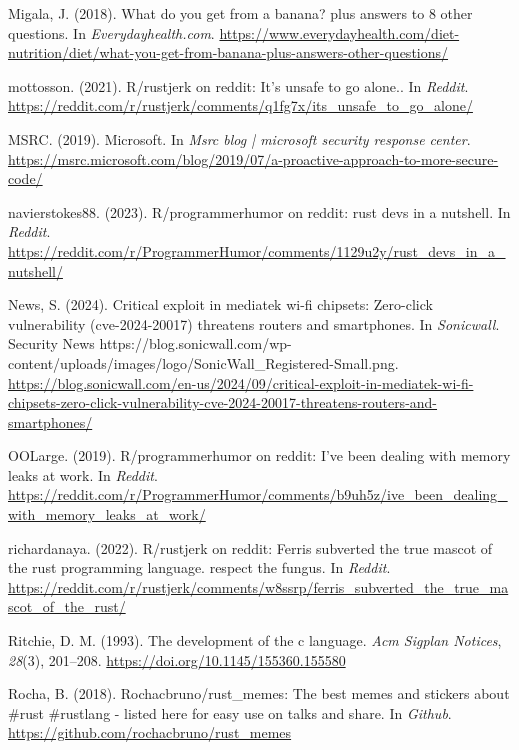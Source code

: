 \documentclass[11pt]{article}
\begin{document}
\begin{hangparas}{1.5em}{1}
\hypertarget{citeproc_bib_item_22}{Migala, J. (2018). What do you get from a banana? plus answers to 8 other questions. In \textit{Everydayhealth.com}. \url{https://www.everydayhealth.com/diet-nutrition/diet/what-you-get-from-banana-plus-answers-other-questions/}}

\hypertarget{citeproc_bib_item_23}{mottosson. (2021). R/rustjerk on reddit: It’s unsafe to go alone.. In \textit{Reddit}. \url{https://reddit.com/r/rustjerk/comments/q1fg7x/its_unsafe_to_go_alone/}}

\hypertarget{citeproc_bib_item_24}{MSRC. (2019). Microsoft. In \textit{Msrc blog | microsoft security response center}. \url{https://msrc.microsoft.com/blog/2019/07/a-proactive-approach-to-more-secure-code/}}

\hypertarget{citeproc_bib_item_25}{navierstokes88. (2023). R/programmerhumor on reddit: rust devs in a nutshell. In \textit{Reddit}. \url{https://reddit.com/r/ProgrammerHumor/comments/1129u2y/rust_devs_in_a_nutshell/}}

\hypertarget{citeproc_bib_item_26}{News, S. (2024). Critical exploit in mediatek wi-fi chipsets: Zero-click vulnerability (cve-2024-20017) threatens routers and smartphones. In \textit{Sonicwall}. Security News https://blog.sonicwall.com/wp-content/uploads/images/logo/SonicWall\_Registered-Small.png. \url{https://blog.sonicwall.com/en-us/2024/09/critical-exploit-in-mediatek-wi-fi-chipsets-zero-click-vulnerability-cve-2024-20017-threatens-routers-and-smartphones/}}

\hypertarget{citeproc_bib_item_27}{OOLarge. (2019). R/programmerhumor on reddit: I’ve been dealing with memory leaks at work. In \textit{Reddit}. \url{https://reddit.com/r/ProgrammerHumor/comments/b9uh5z/ive_been_dealing_with_memory_leaks_at_work/}}

\hypertarget{citeproc_bib_item_28}{richardanaya. (2022). R/rustjerk on reddit: Ferris subverted the true mascot of the rust programming language. respect the fungus. In \textit{Reddit}. \url{https://reddit.com/r/rustjerk/comments/w8ssrp/ferris_subverted_the_true_mascot_of_the_rust/}}

\hypertarget{citeproc_bib_item_29}{Ritchie, D. M. (1993). The development of the c language. \textit{Acm Sigplan Notices}, \textit{28}(3), 201–208. \url{https://doi.org/10.1145/155360.155580}}

\hypertarget{citeproc_bib_item_30}{Rocha, B. (2018). Rochacbruno/rust\_memes: The best memes and stickers about \#rust \#rustlang - listed here for easy use on talks and share. In \textit{Github}. \url{https://github.com/rochacbruno/rust_memes}}


\end{hangparas}
\end{document}
